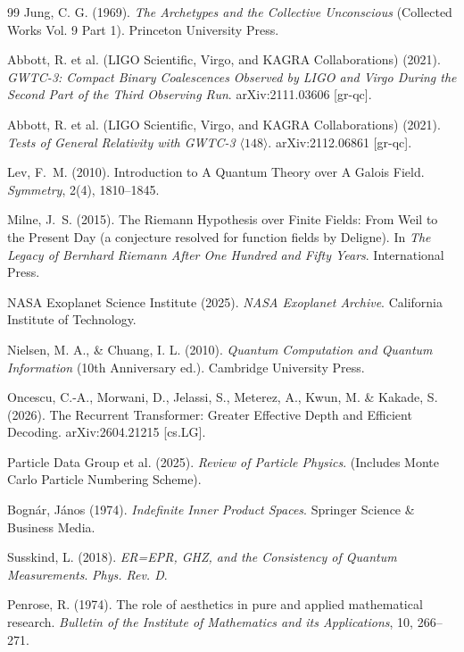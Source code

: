 \begin{thebibliography}{99}
Jung, C. G. (1969).
\textit{The Archetypes and the Collective Unconscious} (Collected Works Vol. 9 Part 1).
Princeton University Press.

Abbott, R. et al. (LIGO Scientific, Virgo, and KAGRA Collaborations) (2021).
\textit{GWTC-3: Compact Binary Coalescences Observed by LIGO and Virgo During the Second Part of the Third Observing Run}.
arXiv:2111.03606 [gr-qc].

Abbott, R. et al. (LIGO Scientific, Virgo, and KAGRA Collaborations) (2021).
\textit{Tests of General Relativity with GWTC-3} $\langle 148 \rangle$.
arXiv:2112.06861 [gr-qc].

Lev, F.~M. (2010).
Introduction to A Quantum Theory over A Galois Field.
\textit{Symmetry}, 2(4), 1810--1845.

Milne, J.~S. (2015).
The Riemann Hypothesis over Finite Fields: From Weil to the Present Day (a conjecture resolved for function fields by Deligne).
In \textit{The Legacy of Bernhard Riemann After One Hundred and Fifty Years}. International Press.

NASA Exoplanet Science Institute (2025).
\textit{NASA Exoplanet Archive}. California Institute of Technology.

Nielsen, M. A., \& Chuang, I. L. (2010).
\textit{Quantum Computation and Quantum Information} (10th Anniversary ed.). Cambridge University Press.

Oncescu, C.-A., Morwani, D., Jelassi, S., Meterez, A., Kwun, M. \& Kakade, S. (2026).
The Recurrent Transformer: Greater Effective Depth and Efficient Decoding.
arXiv:2604.21215 [cs.LG].

Particle Data Group et al. (2025).
\textit{Review of Particle Physics}. 
(Includes Monte Carlo Particle Numbering Scheme).

Bognár, János (1974).
\textit{Indefinite Inner Product Spaces}. 
Springer Science \& Business Media.

Susskind, L. (2018).
\textit{ER=EPR, GHZ, and the Consistency of Quantum Measurements}.
\textit{Phys. Rev. D}.

Penrose, R. (1974).
The role of aesthetics in pure and applied mathematical research.
\textit{Bulletin of the Institute of Mathematics and its Applications}, 10, 266--271.


\end{thebibliography}
